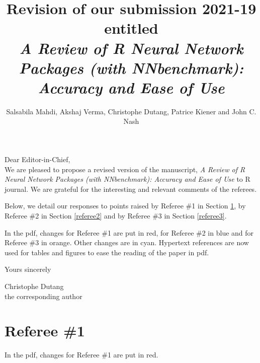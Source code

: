 \documentclass[12pt]{article}
\title{Revision of our submission 2021-19 entitled\\ \textsl{A Review of R Neural Network Packages (with NNbenchmark): Accuracy and Ease of Use}}
\author{Salsabila Mahdi, Akshaj Verma, Christophe Dutang, Patrice Kiener and John C. Nash}
\newcommand{\orange}[1]{{\color{orange}#1}}
\newcommand{\cyan}[1]{{\color{cyan}#1}}
\newcommand{\red}[1]{{\color{red}#1}}
\newcommand{\blue}[1]{{\color{blue}#1}}
\begin{document}
\maketitle

Dear Editor-in-Chief,\\

\noindent We are pleased to propose a revised version of the manuscript, 
\textsl{A Review of R Neural Network Packages (with NNbenchmark): Accuracy and Ease of Use} to R journal. 
We are grateful for the interesting and relevant comments of the referees.

\medskip
Below, we detail our responses to points raised by Referee \#1 in Section \ref{referee1},
by Referee \#2 in Section \ref{referee2} and by Referee \#3 in Section \ref{referee3}.
\medskip

In the pdf, changes for Referee  \#1 are put in \red{red}, for Referee \#2 in \blue{blue} and
for Referee  \#3 in \orange{orange}.  Other changes are in \cyan{cyan}.
Hypertext references are now used for tables and figures to ease the reading of the paper in pdf.

Yours sincerely
\bigskip


Christophe Dutang\\
the corresponding author

 
\newpage
\section{Referee \#1}\label{referee1}

In the pdf, changes for Referee  \#1 are put in \red{red}.  
\end{document}
